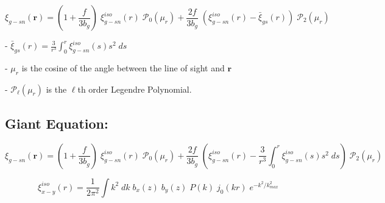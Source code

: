\documentclass{article}
\begin{document}
\begin{equation}
\xi_{g-sn}(\textbf{r}) = (1 + \frac{f}{3 b_g}) \;  \xi^{iso}_{g-sn}(r) \; \mathcal{P}_0(\mu_r) + \frac{2 f}{3 b_g} \;  (\xi^{iso}_{g-sn}(r) - \bar{\xi}_{gs}(r)) \;  \mathcal{P}_2(\mu_r)
\end{equation}

- $\bar{\xi}_{gs}(r) = \frac{3}{r^3}\int^r_0 \xi^{iso}_{g-sn}(s)s^2 \; ds$

- $\mu_r$ is the cosine of the angle between the line of sight and $\textbf{r}$

- $\mathcal{P}_{\mathcal{\ell}}(\mu_r)$ is the $\mathcal{\ell}$th order Legendre Polynomial. 






\subsection{Giant Equation:}

\begin{equation}
\xi_{g-sn}(\textbf{r}) = 
(1 + \frac{f}{3 b_g}) \;  \xi^{iso}_{g-sn}(r) \; \mathcal{P}_0(\mu_r) + 
\frac{2 f}{3 b_g} \;  (\xi^{iso}_{g-sn}(r) -\frac{3}{r^3}\int^r_0 \xi^{iso}_{g-sn}(s)s^2 \; ds) \;  \mathcal{P}_2(\mu_r)
\end{equation}

\begin{equation}
\xi^{iso}_{x-y}(r) = \frac{1}{2 \pi^2} \int k^2 \; dk \; b_x(z) \; b_y(z) \; P(k) \; j_0(kr) \; e^{-k^2/k^2_{max}}
\end{equation}
\end{document}
